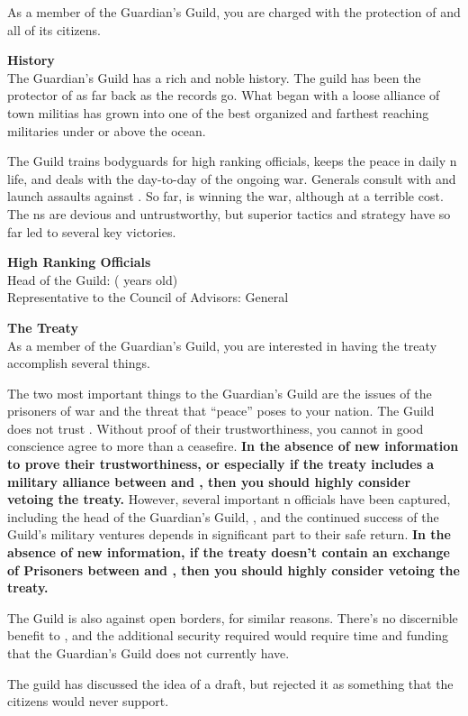 \documentclass[blue]{NeptuneBall}
\begin{document}
\name{\bGuardian{}}

As a member of the Guardian's Guild, you are charged with the protection of \pAtlantis{} and all of its citizens.

{\bf History}\\
The Guardian's Guild has a rich and noble history. The guild has been the protector of \pAtlantis{} as far back as the records go. What began with a loose alliance of town militias has grown into one of the best organized and farthest reaching militaries under or above the ocean.

The Guild trains bodyguards for high ranking officials, keeps the peace in daily \pAtlantis{}n life, and deals with the day-to-day of the ongoing war. Generals consult with \cKing{\King} \cKing{} and launch assaults against \pPacifica{}. So far, \pAtlantis{} is winning the war, although at a terrible cost. The \pPacifica{}ns are devious and untrustworthy, but superior tactics and strategy have so far led to several key victories.

{\bf High Ranking Officials}\\
Head of the Guild: \cKratos{} (\cKratos{\MYnumber} years old)\\
Representative to the Council of Advisors: General \cGeneral{}

{\bf The Treaty}\\
As a member of the Guardian's Guild, you are interested in having the treaty accomplish several things. 

The two most important things to the Guardian's Guild are the issues of the prisoners of war and the threat that ``peace'' poses to your nation.  The Guild does not trust \pPacifica{}. Without proof of their trustworthiness, you cannot in good conscience agree to more than a ceasefire. {\bf In the absence of new information to prove their trustworthiness, or especially if the treaty includes a military alliance between \pAtlantis{} and \pPacifica{}, then you should highly consider vetoing the treaty.} However, several important \pAtlantis{}n officials have been captured, including the head of the Guardian's Guild, \cKratos{}, and the continued success of the Guild's military ventures depends in significant part to their safe return. {\bf In the absence of new information, if the treaty doesn't contain an exchange of Prisoners between \pAtlantis{} and \pPacifica{}, then you should highly consider vetoing the treaty.}

The Guild is also against open borders, for similar reasons. There's no discernible benefit to \pAtlantis{}, and the additional security required would require time and funding that the Guardian's Guild does not currently have.

\begin{itemz}[Trivia]
	\item The guild has discussed the idea of a draft, but rejected it as something that the citizens would never support.
\end{itemz}
\end{document}
